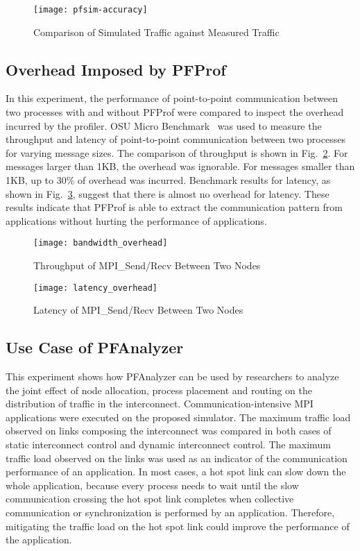 \begin{figure}
    \centering
    \texttt{[image: pfsim-accuracy]}
    \caption{Comparison of Simulated Traffic against Measured Traffic}%
    \label{fig:pfsim-accuracy}
\end{figure}

\subsection{Overhead Imposed by PFProf}

In this experiment, the performance of point-to-point communication
between two processes with and without PFProf were compared to inspect
the overhead incurred by the profiler. OSU Micro
Benchmark~\autocite{omb} was used to measure the throughput and latency
of point-to-point communication between two processes for varying
message sizes. The comparison of throughput is shown in
Fig.~\ref{fig:bandwidth-overhead}. For messages larger than 1KB, the
overhead was ignorable. For messages smaller than 1KB, up to 30\% of
overhead was incurred. Benchmark results for latency, as shown in
Fig.~\ref{fig:latency-overhead}, suggest that there is almost no
overhead for latency. These results indicate that PFProf is able to extract
the communication pattern from applications without hurting the performance of
applications.

\begin{figure}
    \centering
    \texttt{[image: bandwidth\_overhead]}
    \caption{Throughput of MPI\_Send/Recv Between Two Nodes}%
    \label{fig:bandwidth-overhead}
\end{figure}

\begin{figure}
    \centering
    \texttt{[image: latency\_overhead]}
    \caption{Latency of MPI\_Send/Recv Between Two Nodes}%
    \label{fig:latency-overhead}
\end{figure}

\subsection{Use Case of PFAnalyzer}\label{sec:ii-simulation-results}

This experiment shows how PFAnalyzer can be used by researchers to analyze the
joint effect of node allocation, process placement and routing on the
distribution of traffic in the interconnect. Communication-intensive MPI
applications were executed on the proposed simulator. The maximum traffic load
observed on links composing the interconnect was compared in both cases of
static interconnect control and dynamic interconnect control. The maximum
traffic load observed on the links was used as an indicator of the
communication performance of an application. In most cases, a hot spot link
can slow down the whole application, because every process needs to wait until
the slow communication crossing the hot spot link completes when collective
communication or synchronization is performed by an application. Therefore,
mitigating the traffic load on the hot spot link could improve the performance
of the application.

